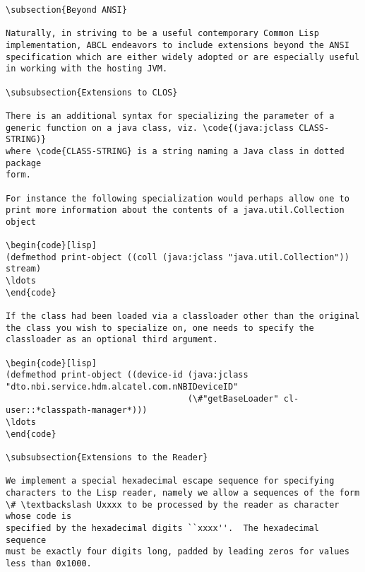 \begin{lstlisting}
\subsection{Beyond ANSI}

Naturally, in striving to be a useful contemporary Common Lisp
implementation, ABCL endeavors to include extensions beyond the ANSI
specification which are either widely adopted or are especially useful
in working with the hosting JVM.

\subsubsection{Extensions to CLOS}

There is an additional syntax for specializing the parameter of a
generic function on a java class, viz. \code{(java:jclass CLASS-STRING)}
where \code{CLASS-STRING} is a string naming a Java class in dotted package
form.

For instance the following specialization would perhaps allow one to
print more information about the contents of a java.util.Collection
object

\begin{code}[lisp]
(defmethod print-object ((coll (java:jclass "java.util.Collection")) stream)
\ldots
\end{code}

If the class had been loaded via a classloader other than the original
the class you wish to specialize on, one needs to specify the
classloader as an optional third argument.

\begin{code}[lisp]
(defmethod print-object ((device-id (java:jclass "dto.nbi.service.hdm.alcatel.com.nNBIDeviceID" 
                                    (\#"getBaseLoader" cl-user::*classpath-manager*)))
\ldots
\end{code}

\subsubsection{Extensions to the Reader}

We implement a special hexadecimal escape sequence for specifying
characters to the Lisp reader, namely we allow a sequences of the form
\# \textbackslash Uxxxx to be processed by the reader as character whose code is
specified by the hexadecimal digits ``xxxx''.  The hexadecimal sequence
must be exactly four digits long, padded by leading zeros for values
less than 0x1000.


\end{lstlisting}
